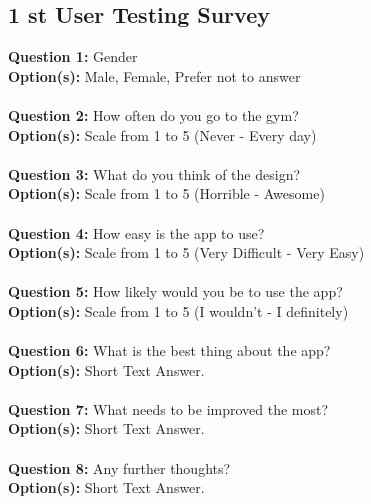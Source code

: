 \documentclass{l4proj}
\begin{document}
\begin{appendices}
\chapter{1 st User Testing Survey}
\label{survey}
\textbf{Question 1:} Gender \\
\textbf{Option(s):}    Male, Female, Prefer not to answer
\\
\\
\textbf{Question 2:} How often do you go to the gym? \\
\textbf{Option(s):}    Scale from 1 to 5 (Never - Every day)
\\
\\
\textbf{Question 3:} What do you think of the design? \\
\textbf{Option(s):}    Scale from 1 to 5 (Horrible - Awesome)
\\
\\
\textbf{Question 4:} How easy is the app to use? \\
\textbf{Option(s):}    Scale from 1 to 5 (Very Difficult - Very Easy)
\\
\\
\textbf{Question 5:} How likely would you be to use the app? 
\\
\textbf{Option(s):}    Scale from 1 to 5 (I wouldn't - I definitely)
\\
\\
\textbf{Question 6:} What is the best thing about the app? \\
\textbf{Option(s):}     Short Text Answer.
\\
\\
\textbf{Question 7:} What needs to be improved the most? \\
\textbf{Option(s):}     Short Text Answer.
\\
\\
\textbf{Question 8:} Any further thoughts? \\
\textbf{Option(s):}     Short Text Answer.



\end{appendices}
\end{document}
